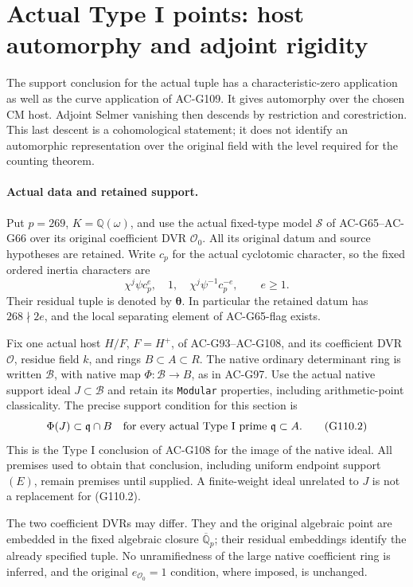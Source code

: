 \section{Actual Type I points: host automorphy and adjoint rigidity}
\label{sec:cubic-typei-host-automorphy-rigidity}

The support conclusion for the actual tuple has a characteristic-zero
application as well as the curve application of AC-G109. It gives
automorphy over the chosen CM host. Adjoint Selmer vanishing then
descends by restriction and corestriction. This last descent is a
cohomological statement; it does not identify an automorphic
representation over the original field with the level required for
the counting theorem.

\paragraph{Actual data and retained support.}
Put \(p=269\), \(K=\mathbb Q(\omega)\), and use the actual fixed-type
model \(\mathscr S\) of AC-G65--AC-G66 over its original coefficient
DVR \(\mathcal O_0\). All its original datum and source hypotheses
are retained. Write \(c_p\) for the actual cyclotomic character,
so the fixed ordered inertia characters are
\[
       \chi^j\psi c_p^e,\quad 1,\quad
                   \chi^j\psi^{-1}c_p^{-e},\qquad e\ge1.
 \tag{G110.1}
\]
Their residual tuple is denoted by \(\boldsymbol\theta\).
In particular the retained datum has \(268\nmid2e\), and
the local separating element of AC-G65-flag exists.

Fix one actual host \(H/F\), \(F=H^+\), of AC-G93--AC-G108,
and its coefficient DVR \(\mathcal O\), residue field \(k\),
and rings \(B\subset A\subset R\). The native ordinary
determinant ring is written \(\mathcal B\), with native map
\(\Phi:\mathcal B\to B\), as in AC-G97. Use the actual
native support ideal \(J\subset\mathcal B\) and retain its
\texttt{Modular} properties, including arithmetic-point
classicality. The precise support condition for this section is
\[
 \Phi(J)\subset\mathfrak q\cap B
       \quad\hbox{for every actual Type I prime }
                    \mathfrak q\subset A.
 \tag{G110.2}
\]
This is the Type I conclusion of AC-G108 for the image of the
native ideal. All premises used to obtain that conclusion,
including uniform endpoint support \((E)\), remain premises
until supplied. A finite-weight ideal unrelated to \(J\) is
not a replacement for (G110.2).

The two coefficient DVRs may differ. They and the original
algebraic point are embedded in the fixed algebraic closure
\(\overline{\mathbb Q}_p\); their residual embeddings identify
the already specified tuple. No unramifiedness of the large
native coefficient ring is inferred, and the original
\(e_{\mathcal O_0}=1\) condition, where imposed, is unchanged.

